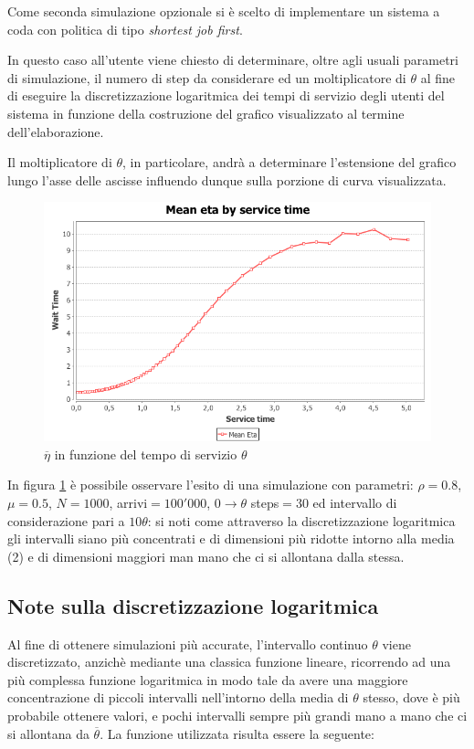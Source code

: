 Come seconda simulazione opzionale si \`e scelto di implementare un sistema a coda con politica di tipo {\em shortest job first}. 

In questo caso all'utente viene chiesto di determinare, oltre agli usuali parametri di simulazione, il numero di step da considerare ed un moltiplicatore di $\theta$ al fine di eseguire la discretizzazione logaritmica dei tempi di servizio degli utenti del sistema in funzione della costruzione del grafico visualizzato al termine dell'elaborazione.

Il moltiplicatore di $\theta$, in particolare, andr\`a a determinare l'estensione del grafico lungo l'asse delle ascisse influendo dunque sulla porzione di curva visualizzata.

\begin{figure}[!h]{
	\begin{center}
	   \includegraphics[width=\textwidth]{figures/MG1SJN[rho_08,mu_05,runs_1000,arrivals_100000,steps_30,mult_10].png}
	\end{center}}
	\caption{$\overline\eta$ in funzione del tempo di servizio $\theta$}
	\label{fig:mg1sjn}
\end{figure}

In figura \ref{fig:mg1sjn} \`e possibile osservare l'esito di una simulazione con parametri: $\rho=0.8$, $\mu=0.5$, $N=1000$, arrivi$=100'000$, $0\rightarrow\theta$ steps$=30$ ed intervallo di considerazione pari a $10\theta$: si noti come attraverso la discretizzazione logaritmica gli intervalli siano pi\`u concentrati e di dimensioni pi\`u ridotte intorno alla media (2) e di dimensioni maggiori man mano che ci si allontana dalla stessa.

\subsection{Note sulla discretizzazione logaritmica}
Al fine di ottenere simulazioni pi\`u accurate, l'intervallo continuo $\theta$ viene discretizzato, anzich\`e mediante una classica funzione lineare, ricorrendo ad una pi\`u complessa funzione logaritmica in modo tale da avere una maggiore concentrazione di piccoli intervalli nell'intorno della media di $\theta$  stesso, dove \`e pi\`u probabile ottenere valori, e pochi intervalli sempre pi\`u grandi mano a mano che ci si allontana da $\overline{\theta}$. La funzione utilizzata risulta essere la seguente: \\

